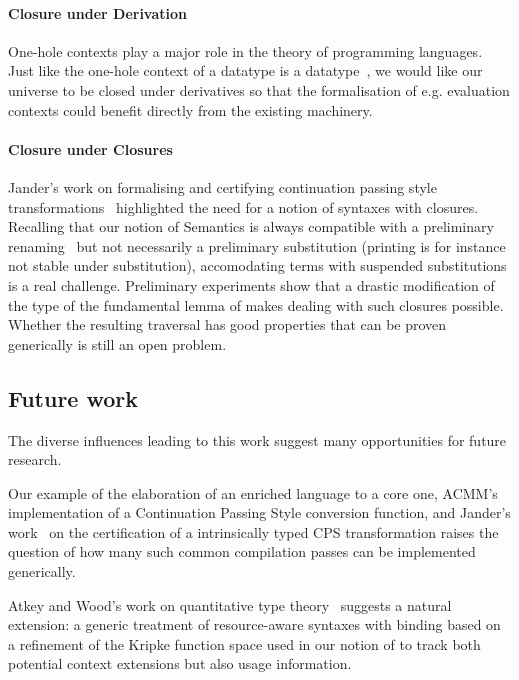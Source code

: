 {\paragraph{Closure under Derivation} One-hole contexts play a major role in the
theory of programming languages. Just like the one-hole context of a datatype is
a datatype~\cite{DBLP:journals/fuin/AbbottAMG05}, we would like our universe to
be closed under derivatives so that the formalisation of e.g. evaluation contexts
could benefit directly from the existing machinery.

\paragraph{Closure under Closures} Jander's work on formalising and certifying
continuation passing style transformations~\cite{Jander:Thesis:2019} highlighted
the need for a notion of syntaxes with closures. Recalling that our notion of
Semantics is always compatible with a preliminary renaming~\cite{Kaiser-wsdebr}
but not necessarily a preliminary substitution (printing is for instance not
stable under substitution), accomodating terms with suspended substitutions is
a real challenge. Preliminary experiments show that a drastic modification of
the type of the fundamental lemma of  makes dealing with such
closures possible. Whether the resulting traversal has good properties that can
be proven generically is still an open problem.

\subsection{Future work}

The diverse influences leading to this work suggest many opportunities for
future research.

Our example of the elaboration of an enriched language to a core one, ACMM's
implementation of a Continuation Passing Style conversion function, and
Jander's work~\citeyear{Jander:Thesis:2019} on the certification of a intrinsically
typed CPS transformation raises the question of how many such common compilation
passes can be implemented generically.

Atkey and Wood's work on quantitative type theory~\cite{DBLP:conf/lics/Atkey18,context-constrained}
suggests a natural extension: a generic treatment of resource-aware syntaxes
with binding based on a refinement of the Kripke function space used in our
notion of  to track both potential context extensions but also
usage information.

}
